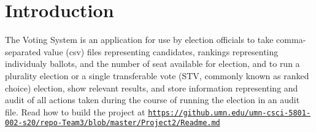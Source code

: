 \hypertarget{index_intro_sec}{}\section{Introduction}\label{index_intro_sec}
The Voting System is an application for use by election officials to take comma-\/separated value (csv) files representing candidates, rankings representing individualy ballots, and the number of seat available for election, and to run a plurality election or a single transferable vote (S\+TV, commonly known as ranked choice) election, show relevant results, and store information representing and audit of all actions taken during the course of running the election in an audit file. Read how to build the project at \href{https://github.umn.edu/umn-csci-5801-002-s20/repo-Team3/blob/master/Project2/Readme.md}{\tt https\+://github.\+umn.\+edu/umn-\/csci-\/5801-\/002-\/s20/repo-\/\+Team3/blob/master/\+Project2/\+Readme.\+md} 